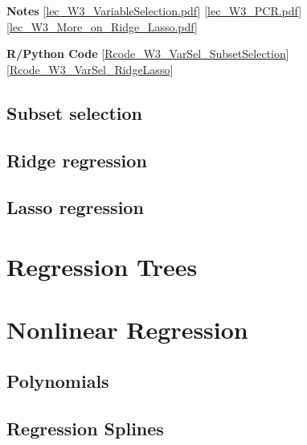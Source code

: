 \documentclass[
]{book}
\begin{document}
\textbf{Notes}
{[}\href{https://liangfgithub.github.io/Notes/lec_W3_VariableSelection.pdf}{lec\_W3\_VariableSelection.pdf}{]}
{[}\href{https://liangfgithub.github.io/Notes/lec_W3_PCR.pdf}{lec\_W3\_PCR.pdf}{]}
{[}\href{https://liangfgithub.github.io/Notes/lec_W3_More_on_Ridge_Lasso.pdf}{lec\_W3\_More\_on\_Ridge\_Lasso.pdf}{]}

\textbf{R/Python Code}
{[}\href{https://liangfgithub.github.io/Rcode_W3_VarSel_SubsetSelection.html}{Rcode\_W3\_VarSel\_SubsetSelection}{]}
{[}\href{https://liangfgithub.github.io/Rcode_W3_VarSel_RidgeLasso.html}{Rcode\_W3\_VarSel\_RidgeLasso}{]}

\hypertarget{subset-selection}{%
\section{Subset selection}\label{subset-selection}}

\hypertarget{ridge-regression}{%
\section{Ridge regression}\label{ridge-regression}}

\hypertarget{lasso-regression}{%
\section{Lasso regression}\label{lasso-regression}}

\hypertarget{regression-trees}{%
\chapter{Regression Trees}\label{regression-trees}}

\hypertarget{nonlinear-regression}{%
\chapter{Nonlinear Regression}\label{nonlinear-regression}}

\hypertarget{polynomials}{%
\section{Polynomials}\label{polynomials}}

\hypertarget{regression-splines}{%
\section{Regression Splines}\label{regression-splines}}
\end{document}
